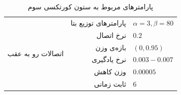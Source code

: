 \documentclass[12pt]{report}
\begin{document}
\begin{table}[p]
{\begin{tabular}{|rrrl|}
\multicolumn{1}{|r|}{\multirow{6}{*}{اتصالات رو به عقب}}        & \multicolumn{2}{r|}{پارامتر‌های توزیع بتا}                                                                         & $\alpha=3, \beta=80$               \\ \cline{2-4} 
\multicolumn{1}{|r|}{}                                          & \multicolumn{2}{r|}{نرخ اتصال}                                                                                     & $0.2$                     \\ \cline{2-4} 
\multicolumn{1}{|r|}{}                                          & \multicolumn{2}{r|}{بازه‌ی وزن}                                                                                    & $(0, 0.95)$               \\ \cline{2-4} 
\multicolumn{1}{|r|}{}                                          & \multicolumn{2}{r|}{نرخ یادگیری}                                                                                   &    $0.003 - 0.007$        \\ \cline{2-4} 
\multicolumn{1}{|r|}{}                                          & \multicolumn{2}{r|}{وزن کاهش}                                                                                      & $0.00005$                \\ \cline{2-4} 
\multicolumn{1}{|r|}{}                                          & \multicolumn{2}{r|}{ثابت زمانی}                                                                                    & $6$                       \\ \hline
	\end{tabular}}
\caption{\label{table:parameters-cc-3}پارامتر‌های مربوط به ستون‌ کورتکسی سوم}
\end{table}
\end{document}
